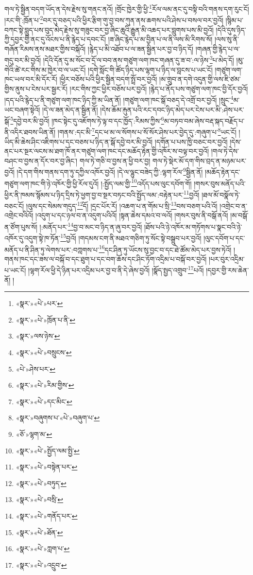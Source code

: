 གལ་ཏེ་སྦྱིན་བདག་ཡོད་ན་དེས་རྗེས་སུ་གནང་ནའོ། །གྲོང་ཁྱེར་གྱི་ཕྱི་\footnote{«སྣར་»«པེ་»པར་}རོལ་ལམ་ནང་དུ་བསྟི་བའི་གནས་དག་རུང་ངོ། །རང་གི་:ཁྲོན་པ་\footnote{«སྣར་»«པེ་»ཁྲོན་པ་ནི་}བར་དུ་བཅད་པའི་ཕྱིར་རྩིག་གུ་བྱ་བས་ཀུན་ནས་ཆགས་པའི་ཤེས་པ་བསལ་བར་བྱའོ། །སྙིམ་པ་བཀང་སྟེ་བླུད་པས་བུད་མེད་རྗེས་སུ་གཟུང་བར་བྱ་ཞིང་ཆུའི་རྒྱུན་མི་འཆད་པར་བླུགས་པས་མི་བྱའོ། །དེའི་དུས་ཉིད་ཀྱི་དབྱར་གྱི་ནང་དུ་འོངས་པ་ནི་རྙེད་པ་དབང་ངོ། །ཟ་ཞིང་རྙེད་པ་མ་བྱིན་པ་ལ་ནི་ལས་མི་རིགས་སོ། །ལས་སུ་ནི་གཞོན་རིམས་ནས་མཐར་གྱིས་བསྐོའོ། །རྙེད་པ་མི་འཐོབ་པ་ལ་ཟན་སྦྱིན་པར་བྱ་བ་ཉིད་དོ། །གཞན་གྱི་རྙེད་པ་ལ་གདུ་བར་མི་བྱའོ། །དེའི་དོན་དུ་མ་སོང་བ་དྲོ་ལ་བབ་ནས་གཙུག་ལག་ཁང་གཞན་དུ་ཟ་བ་:ལ་ཉེས་\footnote{«སྣར་»ལས་ཉེས་}པ་མེད་དོ། །མུ་གེའི་ཚེ་རང་གིས་མ་ཁྱེར་བ་ལ་ཡང་ངོ། །དགེ་སློང་གི་ཚོད་ཉིད་པས་ལྷག་པ་ཉིད་ལ་བླངས་པ་ཡང་ངོ། །གཙུག་ལག་ཁང་ཡལ་བར་མི་དོར་རོ། །ཕྱིར་བཅོས་པའི་ཕྱིར་སྦྱིན་བདག་སྤྲོ་བར་བྱའོ། །མ་གྲུབ་ན་དགེ་འདུན་གྱི་ལས་ཇི་ཙམ་གྱིས་ནུས་པ་ངེས་པར་སྦྱར་རོ། །རང་གིས་ཀྱང་ཕྱིར་བཅོས་པར་བྱའོ། །རྙེད་པ་ནོད་པས་གཙུག་ལག་ཁང་བྱི་དོར་བྱའོ། །དད་པའི་རྙེད་པ་ནི་གཙུག་ལག་ཁང་ཉིད་ཀྱི་མ་ཡིན་ནོ། །གཙུག་ལག་ཁང་སྒོ་བཅད་དེ་འགྲོ་བར་བྱའོ། །སྲུང་\footnote{«སྣར་»«པེ་»བསྲུངས་}མ་ཡང་བཞག་སྟེའོ། །དེ་ལ་ཟན་མེད་ན་སྦྱིན་ནོ། །དེས་ཆོམ་རྐུན་པའི་རང་དབང་ཉིད་མེད་པར་ངེས་པར་མི་:ཤེས་པར་སྒོ་\footnote{«པེ་»ཤེས་པར་}དབྱེ་བར་མི་བྱའོ། །ཁང་སྟེང་དུ་འཇོགས་ཏེ་ལྟ་བ་དང་ཁྱོད་:རིམས་ཀྱིས་\footnote{«སྣར་»«པེ་»རིམ་གྱིས་}མ་བཏབ་བམ་ཞེས་བརྡ་སྐད་བརྗོད་པ་ནི་འདིར་ཐབས་ཡིན་ནོ། །གནས་:དང་མི་\footnote{«སྣར་»«པེ་»དང་མིང་}དང་ཕ་མ་ལ་སོགས་པ་སོ་སོར་ཤེས་པར་བྱེད་དུ་:གཞུག་པ་\footnote{«སྣར་»བཞུགས་པ་«པེ་»བཞུག་པ་}ཡང་ངོ། །ཡིད་མི་ཆེས་ཤིང་འཇིགས་པ་དང་བཅས་པ་ཉིད་ན་སྒོ་དབྱེ་བར་མི་བྱའོ། །དགོན་པ་པས་ཁྱི་བཅང་བར་བྱའོ། །དེས་ནང་པར་སྔར་ལངས་མ་ཐག་ཁོ་ནར་གཙུག་ལག་ཁང་དང་མཆོད་རྟེན་གྱི་འཁོར་ས་བལྟ་བར་བྱའོ། །གལ་ཏེ་དེས་བཤང་བ་བྱས་ན་དོར་བར་བྱ་ཞིང་། གལ་ཏེ་གཅི་བ་བྱས་ན་ཕྱི་བར་བྱ། གལ་ཏེ་སྡེར་མོ་དག་གིས་བྲད་ན་མཉམ་པར་བྱའོ། །དེ་དག་གིས་གནས་དག་ཏུ་དཀྱིལ་འཁོར་བྱའོ། །དེ་ལ་ལྷུང་བཟེད་ཀྱི་:ལྷག་རོལ་\footnote{«ཅོ་»ལྷག་མ་}སྦྱིན་ནོ། །མཆོད་རྟེན་དང་གཙུག་ལག་ཁང་གི་ཉེ་འཁོར་གྱི་ཕྱི་རོལ་དུའོ། །:སྤྱོད་ལམ་གྱི་\footnote{«སྣར་»«པེ་»སྤྱོད་ལམ་སྤྱི་}འདོད་པས་ལུང་དབོག་གོ། །གསར་བུས་མནོད་པའི་ཕྱིར་ནི་ཁམས་སྙོམས་པ་ཉིད་དྲིས་ཏེ་ཕྱག་བྱ་བ་སྔར་བཏང་བའི་སྤྱོད་ལམ་:བརྟེན་པར་\footnote{«སྣར་»«པེ་»བསྟེན་པར་}བྱའོ། །ཐལ་མོ་བསྣོལ་ཏེ་བཅང་ངོ། །ལུས་དང་སེམས་གདུད་\footnote{«སྣར་»«པེ་»བཏུད་}དོ། །དྲང་པོར་རོ། །འཆག་པ་ན་གོམ་པ་སྲི་\footnote{«སྣར་»«པེ་»བསྲི་}བས་བཅག་པའི་འོ། །འགྲེང་བ་ན་འགྲེང་བའིའོ། །འདུག་པ་དང་ཉལ་བ་ན་འདུག་པའིའོ། །སྟན་ཆེས་དམའ་བ་ལའོ། །གསར་བུས་ནི་བསྒོ་ནའོ། །མ་བསྒོ་ན་ཙོག་པུས་སོ། །:མནོད་པར་\footnote{«སྣར་»«པེ་»གནོད་པར་}བྱ་བ་མང་བ་ཉིད་ན་ཞུ་བར་བྱའོ། །ཐོས་པའི་ཉེ་འཁོར་མ་གཏོགས་པ་སྣང་བའི་ཉེ་འཁོར་དུ་འདུག་སྟེ་ཁ་ཏོན་\footnote{«སྣར་»«པེ་»ཐོན་}བྱའོ། །གདམས་ངག་ནི་མཐའ་གཅིག་ཏུ་སོང་སྟེ་བསྒྲུབ་པར་བྱའོ། །ལུང་དབོག་པ་དང་མནོད་པ་ནི་ཤིན་ཏུ་ལེགས་པར་:བཀླགས་པ་\footnote{«སྣར་»«པེ་»ཀླག་པ་}དང་ཤིན་ཏུ་ཡོངས་སུ་བྱང་བ་དང་ཐེ་ཚོམ་མེད་པར་བྱས་ཏེའོ། །གནས་ཁང་དང་ཟས་ལ་བསྐོ་བ་དང་ཐུག་པ་དང་བག་ཆོས་དང་ཤིང་ཏོག་འདྲིམ་པ་བསྐོ་བར་བྱའོ། །པར་བུར་འདྲིམ་པ་ཡང་ངོ། །ལྷག་རོལ་ཕྱི་དེ་ཉིན་པར་འདྲིམ་པར་བྱ་བ་ནི་དེ་ཞེས་བྱའོ། །སྣོད་སྤྱད་འགྲུབ་\footnote{«སྣར་»«པེ་»འདྲུབ་}པའོ། །དབྱར་གྱི་རས་ཆེན་ནོ། །
